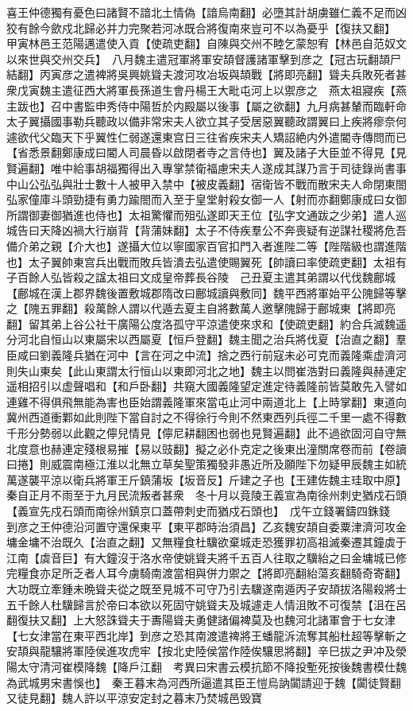 喜王仲德獨有憂色曰諸賢不諳北土情偽【諳烏南翻】必墮其計胡虜雖仁義不足而凶狡有餘今歛戍北歸必并力完聚若河冰既合將復南來豈可不以為憂乎【復扶又翻】　甲寅林邑王范陽邁遣使入貢【使疏吏翻】自陳與交州不睦乞蒙恕宥【林邑自范奴文以來世與交州交兵】　八月魏主遣冠軍將軍安頡督護諸軍擊到彦之【冠古玩翻頡尸結翻】丙寅彦之遣裨將吳興姚聳夫渡河攻冶坂與頡戰【將即亮翻】聳夫兵敗死者甚衆戊寅魏主遣征西大將軍長孫道生會丹楊王大毗屯河上以禦彦之　燕太祖寢疾【燕主跋也】召中書監申秀侍中陽哲於内殿屬以後事【屬之欲翻】九月病甚輦而臨軒命太子翼攝國事勒兵聽政以備非常宋夫人欲立其子受居惡翼聽政謂翼曰上疾將瘳奈何遽欲代父臨天下乎翼性仁弱遂還東宫日三往省疾宋夫人矯詔絶内外遣閽寺傳問而已【省悉景翻鄭康成曰閽人司晨昏以啟閉者寺之言侍也】翼及諸子大臣並不得見【見賢遍翻】唯中給事胡福獨得出入專掌禁衛福慮宋夫人遂成其謀乃言于司徒錄尚書事中山公弘弘與壯士數十人被甲入禁中【被皮義翻】宿衛皆不戰而散宋夫人命閉東閤弘家僮庫斗頭勁捷有勇力踰閤而入至于皇堂射殺女御一人【射而亦翻鄭康成曰女御所謂御妻御猶進也侍也】太祖驚懼而殂弘遂即天王位【弘字文通跋之少弟】遣人巡城告曰天降凶禍大行崩背【背蒲妹翻】太子不侍疾羣公不奔喪疑有逆謀社稷將危吾備介弟之親【介大也】遂攝大位以寧國家百官扣門入者進陛二等【陛階級也謂進階也】太子翼帥東宫兵出戰而敗兵皆潰去弘遣使賜翼死【帥讀曰率使疏吏翻】太祖有子百餘人弘皆殺之諡太祖曰文成皇帝葬長谷陵　己丑夏主遣其弟謂以代伐魏鄜城【鄜城在漢上郡界魏後置敷城郡隋改曰鄜城讀與敷同】魏平西將軍始平公隗歸等擊之【隗五罪翻】殺萬餘人謂以代遁去夏主自將數萬人邀擊隗歸于鄜城東【將即亮翻】留其弟上谷公社干廣陽公度洛孤守平涼遣使來求和【使疏吏翻】約合兵滅魏遥分河北自恒山以東屬宋以西屬夏【恒戶登翻】魏主聞之治兵將伐夏【治直之翻】羣臣咸曰劉義隆兵猶在河中【言在河之中流】捨之西行前寇未必可克而義隆乘虚濟河則失山東矣【此山東謂太行恒山以東即河北之地】魏主以問崔浩對曰義隆與赫連定遥相招引以虚聲唱和【和戶卧翻】共窺大國義隆望定進定待義隆前皆莫敢先入譬如連雞不得俱飛無能為害也臣始謂義隆軍來當屯止河中兩道北上【上時掌翻】東道向冀州西道衝鄴如此則陛下當自討之不得徐行今則不然東西列兵徑二千里一處不得數千形分勢弱以此觀之儜兒情見【儜尼耕翻困也弱也見賢遍翻】此不過欲固河自守無北度意也赫連定殘根易摧【易以豉翻】擬之必仆克定之後東出潼關席卷而前【卷讀曰捲】則威震南極江淮以北無立草矣聖策獨發非愚近所及願陛下勿疑甲辰魏主如統萬遂襲平涼以衛兵將軍王斤鎮蒲坂【坂音反】斤建之子也【王建佐魏主珪取中原】　秦自正月不雨至于九月民流叛者甚衆　冬十月以竟陵王義宣為南徐州刺史猶戍石頭【義宣先戍石頭而南徐州鎮京口蓋帶刺史而猶戍石頭也】　戊午立錢署鑄四銖錢　到彦之王仲德沿河置守還保東平【東平郡時治須昌】乙亥魏安頡自委粟津濟河攻金墉金墉不治既久【治直之翻】又無糧食杜驥欲棄城走恐獲罪初高祖滅秦遷其鐘虡于江南【虡音巨】有大鐘沒于洛水帝使姚聳夫將千五百人往取之驥紿之曰金墉城已修完糧食亦足所乏者人耳今虜騎南渡當相與併力禦之【將即亮翻紿蕩亥翻騎奇寄翻】大功既立牽鍾未晩聳夫從之既至見城不可守乃引去驥遂南遁丙子安頡拔洛陽殺將士五千餘人杜驥歸言於帝曰本欲以死固守姚聳夫及城遽走人情沮敗不可復禁【沮在呂翻復扶又翻】上大怒誅聳夫于夀陽聳夫勇健諸偏裨莫及也魏河北諸軍會于七女津【七女津當在東平西北岸】到彦之恐其南渡遣禆將王蟠龍泝流奪其船杜超等擊斬之安頡與龍驤將軍陸侯進攻虎牢【按北史陸侯當作陸俟驤思將翻】辛巳拔之尹冲及滎陽太守清河崔模降魏【降戶江翻　考異曰宋書云模抗節不降投塹死按後魏書模仕魏為武城男宋書悞也】　秦王暮末為河西所逼遣其臣王愷烏訥闐請迎于魏【闐徒賢翻又徒見翻】魏人許以平涼安定封之暮末乃焚城邑毁寶